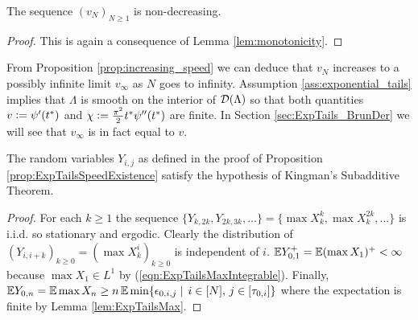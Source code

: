 \begin{proposition}\label{prop:increasing_speed}
The sequence $(v_N)_{N \geq 1}$ is non-decreasing. 
\end{proposition}
\begin{proof}
This is again a consequence of Lemma \ref{lem:monotonicity}. 
\end{proof}

\begin{remark}\label{rem:constants}
From Proposition \ref{prop:increasing_speed} we can deduce that $v_N$ increases to a possibly infinite limit $v_\infty$ as $N$ goes to infinity. Assumption \ref{ass:exponential_tails} implies that $\Lambda$ is smooth on the interior of $\cal{D}(\Lambda)$ so that both quantities $v \defeq \psi'(t^*)$ and $\chi \defeq \frac{\pi^2}{2} t^* \psi''(t^*)$ are finite. In Section \ref{sec:ExpTails_BrunDer} we will see that $v_\infty$ is in fact equal to $v$. 
\end{remark}

\begin{lemma}\label{lem:ExpTailsKingmanHolds}
The random variables $Y_{i,j}$ as defined in the proof of Proposition \ref{prop:ExpTailsSpeedExistence} satisfy the hypothesis of Kingman's Subadditive Theorem. 
\end{lemma}

\begin{proof}
For each $k \geq 1$ the sequence $\{Y_{k, 2k}, Y_{2k, 3k}, ...\} = \{\max X^k_k, \max X^{2k}_k, ... \}$ is i.i.d. so stationary and ergodic. Clearly the distribution of $(Y_{i, i + k})_{k \geq 0} = (\max X^i_k)_{k \geq 0}$ is independent of $i$. $\E Y^+_{0,1} = \E (\max X_1)^+ < \infty$ because $\max X_1 \in L^1$ by (\ref{eqn:ExpTailsMaxIntegrable}). Finally, $\E Y_{0, n} = \E \max X_n \geq n\, \E \min\{\epsilon_{0, i, j} \mid\, i \in [N],\, j \in [\tau_{0, i}]\}$ where the expectation is finite by Lemma \ref{lem:ExpTailsMax}. 
\end{proof}

